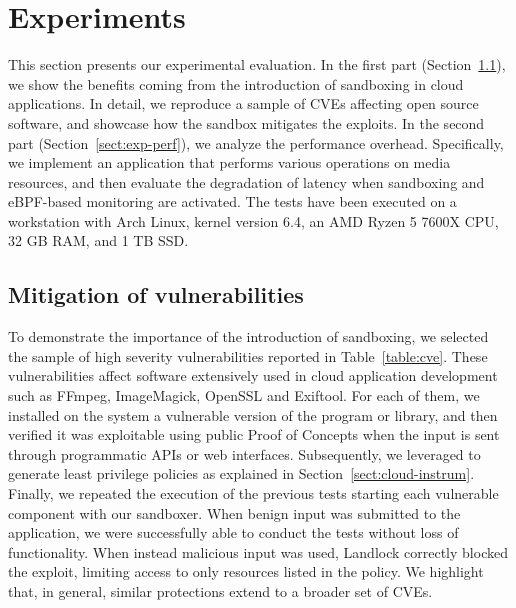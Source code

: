 \section{Experiments}\label{sect:exp}

This section presents our experimental evaluation. In the first part
(Section~\ref{sect:exp-mitig}), we show the benefits coming from the
introduction of sandboxing in cloud applications. In detail, we
reproduce a sample of CVEs affecting open source software, and
showcase how the sandbox mitigates the exploits. In the second part
(Section~\ref{sect:exp-perf}), we analyze the performance
overhead. Specifically, we implement an application that performs
various operations on media resources, and then evaluate the
degradation of latency when sandboxing and eBPF-based monitoring are
activated. The tests have been executed on a workstation with Arch
Linux, kernel version 6.4, an AMD Ryzen 5 7600X CPU, 32 GB RAM, and 1
TB SSD.

\subsection{Mitigation of vulnerabilities}\label{sect:exp-mitig}

To demonstrate the importance of the introduction of sandboxing, we
selected the sample of high severity vulnerabilities reported in
Table~\ref{table:cve}. These vulnerabilities affect software
extensively used in cloud application development such as FFmpeg,
ImageMagick, OpenSSL and Exiftool. For each of them, we installed on
the system a vulnerable version of the program or library, and then
verified it was exploitable using public Proof of Concepts when the
input is sent through programmatic APIs or web
interfaces. Subsequently, we leveraged \dmng to generate least
privilege policies as explained in
Section~\ref{sect:cloud-instrum}. Finally, we repeated the execution
of the previous tests starting each vulnerable component with our
sandboxer. When benign input was submitted to the application, we were
successfully able to conduct the tests without loss of
functionality. When instead malicious input was used, Landlock
correctly blocked the exploit, limiting access to only resources
listed in the policy. We highlight that, in general, similar
protections extend to a broader set of CVEs.



